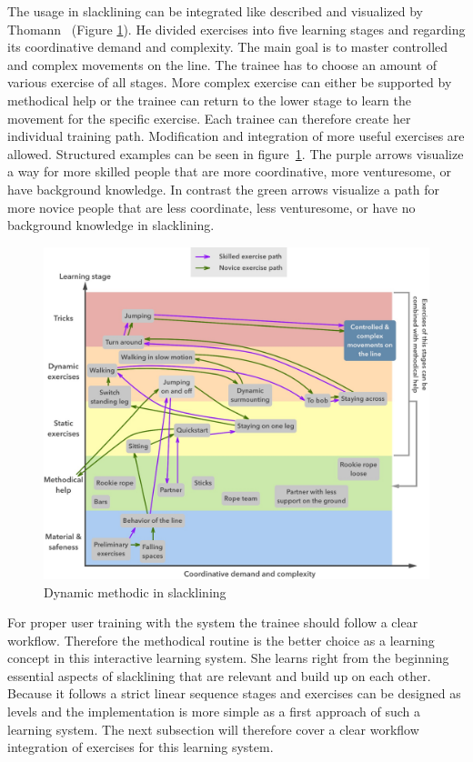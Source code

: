 The usage in slacklining can be integrated like described and visualized by Thomann~\cite{Thomann2013-aa} (Figure \ref{fig:3_3_1_dynamicMethod}). He divided exercises into five learning stages and regarding its coordinative demand and complexity. The main goal is to master controlled and complex movements on the line. The trainee has to choose an amount of various exercise of all stages. More complex exercise can either be supported by methodical help or the trainee can return to the lower stage to learn the movement for the specific exercise. Each trainee can therefore create her individual training path. Modification and integration of more useful exercises are allowed. Structured examples can be seen in figure~\ref{fig:3_3_1_dynamicMethod}. The purple arrows visualize a way for more skilled people that are more coordinative, more venturesome, or have background knowledge. In contrast the green arrows visualize a path for more novice people that are less coordinate, less venturesome, or have no background knowledge in slacklining.
\begin{figure}[htb]
	\centering
	\begin{minipage}[t]{1\linewidth}
		\centering
		\includegraphics[width=1\linewidth]{Pictures/3_3_1_dynamicMethodBoth2}
		\caption{Dynamic methodic in slacklining~\cite{Thomann2013-aa}}
		\label{fig:3_3_1_dynamicMethod}
	\end{minipage}
\end{figure}

For proper user training with the system the trainee should follow a clear workflow. Therefore the methodical routine is the better choice as a learning concept in this interactive learning system. She learns right from the beginning essential aspects of slacklining that are relevant and build up on each other. Because it follows a strict linear sequence stages and exercises can be designed as levels and the implementation is more simple as a first approach of such a learning system. 
The next subsection \textit{} will therefore cover a clear workflow integration of exercises for this learning system.

